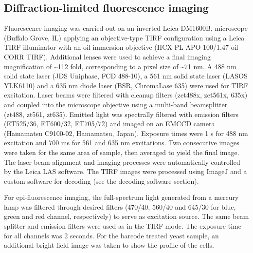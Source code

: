 \subsection{Diffraction-limited fluorescence imaging}
Fluorescence imaging was carried out on an inverted Leica DM1600B, microscope (Buffalo Grove, IL) applying an objective-type TIRF configuration using a Leica TIRF illuminator with an oil-immersion objective (HCX PL APO 100/1.47 oil CORR TIRF).  Additional lenses were used to achieve a final imaging magnification of \textasciitilde112 fold, corresponding to a pixel size of \textasciitilde71 nm. A 488 nm solid state laser (JDS Uniphase, FCD 488-10), a 561 nm solid state laser (LASOS YLK6110) and a 635 nm diode laser (BSR, ChromaLase 635) were used for TIRF excitation. Laser beams were filtered with cleanup filters (zet488x, zet561x, 635x) and coupled into the microscope objective using a multi-band beamsplitter (zt488, zt561, zt635). Emitted light was spectrally filtered with emission filters (ET525/36, ET600/32, ET705/72) and imaged on an EMCCD camera (Hamamatsu C9100-02, Hamamatsu, Japan). Exposure times were 1 s for 488 nm excitation and 700 ms for 561 and 635 nm excitations. Two consecutive images were taken for the same area of sample,  then averaged to yield the final image. The laser beam alignment and imaging processes were automatically controlled by the Leica LAS software. The TIRF images were processed using ImageJ and a custom software for decoding (see the decoding software section).

For epi-fluorescence imaging, the full-spectrum light generated from a mercury lamp was filtered through desired filters (470/40, 560/40 and 645/30 for blue, green and red channel, respectively) to serve as excitation source. The same beam splitter and emission filters were used as in the TIRF mode. The exposure time for all channels was 2 seconds. For the barcode treated yeast sample, an additional bright field image was taken to show the profile of the cells. 

